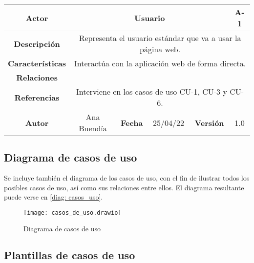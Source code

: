 \begin{table}[!h]
\begin{tabular}{|c|c|c|c|c|c|c|c|}
\hline
 \rowcolor{cyan} \textbf{Actor} & \multicolumn{6}{|c|}{Usuario} & {A-1} \\
\hline
 \cellcolor{cyan} \textbf{Descripción}              & \multicolumn{7}{|c|}{Representa el usuario estándar que va a usar la página web.}           \\
\hline
 \cellcolor{cyan} \textbf{Características}                 & \multicolumn{7}{|c|}{Interactúa con la aplicación web de forma directa.}             \\
\hline
 \cellcolor{cyan} \textbf{Relaciones}         & \multicolumn{7}{|c|}{}             \\
\hline
\cellcolor{cyan} \textbf{Referencias}        & \multicolumn{7}{|c|}{Interviene en los casos de uso CU-1, CU-3 y CU-6.}              \\
\hline
\cellcolor{cyan} \textbf{Autor}                &   Ana Buendía  & \multicolumn{2}{|c|}{\cellcolor{cyan} \textbf{Fecha}} &  25/04/22   & \multicolumn{2}{|c|}{\cellcolor{cyan} \textbf{Versión}} & 1.0  \\
\hline
\end{tabular}
\end{table}

\subsection{Diagrama de casos de uso}

Se incluye también el diagrama de los casos de uso, con el fin de ilustrar todos los posibles casos de uso, así como sus relaciones entre ellos. El diagrama resultante puede verse en \eqref{diag: casos_uso}.

\begin{figure}[!h]
\begin{center}
\caption{Diagrama de casos de uso}
\label{diag: casos_uso}
\texttt{[image: casos\_de\_uso.drawio]}
\end{center}
\end{figure}



\clearpage

\subsection{Plantillas de casos de uso}



